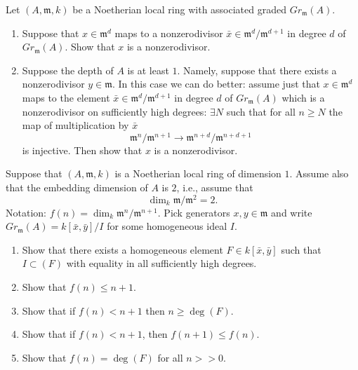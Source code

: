 \begin{exercise}
\label{exercise-nonzerodivisor-graded}
Let $(A, {\mathfrak m}, k)$ be a Noetherian local ring with associated
graded $Gr_{\mathfrak m}(A)$.
\begin{enumerate}
\item Suppose that $x\in {\mathfrak m}^d$ maps to a nonzerodivisor
$\bar x \in {\mathfrak m}^d/{\mathfrak m}^{d + 1}$ in degree $d$ of
$Gr_{\mathfrak m}(A)$.
Show that $x$ is a nonzerodivisor.
\item Suppose the depth of $A$ is at least $1$.
Namely, suppose that there exists a nonzerodivisor $y \in {\mathfrak m}$.
In this case we can do better: assume just that $x\in {\mathfrak m}^d$ maps to
the element $\bar x \in {\mathfrak m}^d/{\mathfrak m}^{d + 1}$ in degree $d$
of $Gr_{\mathfrak m}(A)$ which is a nonzerodivisor on sufficiently
high degrees: $\exists N$ such that for all $n \geq N$ the map
of multiplication by $\bar x$
$$
{\mathfrak m}^n/{\mathfrak m}^{n + 1} \longrightarrow
{\mathfrak m}^{n + d}/{\mathfrak m}^{n + d + 1}
$$
is injective. Then show that $x$ is a nonzerodivisor.
\end{enumerate}
\end{exercise}

\begin{exercise}
\label{exercise-embedding-2-dim-1}
Suppose that $(A, {\mathfrak m}, k)$ is a Noetherian local ring of
dimension $1$. Assume also that the embedding dimension of $A$ is
$2$, i.e., assume that
$$
\dim_k {\mathfrak m}/{\mathfrak m}^2 = 2.
$$
Notation: $f(n) = \dim_k {\mathfrak m}^n/{\mathfrak m}^{n + 1}$.
Pick generators $x, y \in {\mathfrak m}$
and write $Gr_{\mathfrak m}(A) = k[\bar x, \bar y]/I$ for some
homogeneous ideal $I$.
\begin{enumerate}
\item Show that there exists a homogeneous element
$F\in k[\bar x, \bar y]$ such that $I \subset (F)$ with equality
in all sufficiently high degrees.
\item Show that $f(n) \leq n + 1$.
\item Show that if $f(n) < n + 1$ then $n \geq \deg(F)$.
\item Show that if $f(n) < n + 1$, then $f(n + 1) \leq f(n)$.
\item Show that $f(n) = \deg(F)$ for all $n >> 0$.
\end{enumerate}
\end{exercise}

